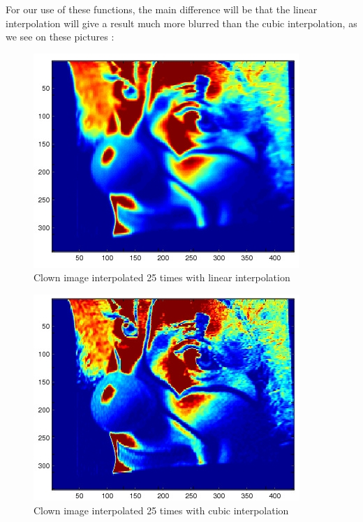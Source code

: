 \documentclass[accepted,single]{gipaper}
\begin{document}
For our use of these functions, the main difference will be that the linear interpolation will give a result much more blurred than the cubic interpolation, as we see on these pictures :
\begin{center}
\begin{figure}[h!]
\includegraphics[width=0.8\columnwidth]{25linear.jpg}
\caption{Clown image interpolated 25 times with linear interpolation}
\end{figure}
\begin{figure}[h!]
\includegraphics[width=0.8\columnwidth]{25cubic.jpg}
\caption{Clown image interpolated 25 times with cubic interpolation}
\end{figure}
\end{center}

\end{document}
